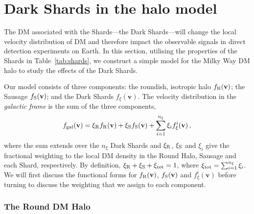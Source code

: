 \documentclass[prd,10pt,twocolumn,showpacs,nofootinbib,aps,superscriptaddress,preprintnumbers]{revtex4-1}
\newcommand{\vbf}{\mathbf{v}}
\newcommand{\fR}{f_{\rm R}}
\newcommand{\fS}{f_{\rm S}}
\newcommand{\Gaia}{\!{\it Gaia}\xspace}
\begin{document}
 \section{Dark Shards in the halo model}\label{sec:darkshards}

The DM associated with the Shards---the Dark Shards---will
change the local velocity distribution of DM and therefore impact
the observable signals in direct detection experiments on Earth.  In
this section, utilising the properties of the Shards in
Table~\ref{tab:shards}, we construct a simple model for the Milky Way DM halo
to study the effects of the Dark Shards.

  Our model consists of three components: the roundish, isotropic halo
  $\fR (\vbf)$; the \Gaia Sausage $\fS(\vbf)$; and the Dark Shards
  $f_\xi(\vbf)$.  The velocity distribution in the {\it galactic frame}
  is the sum of the three components,
  \begin{equation}\label{eq:shmpp}
    f_{\rm{gal}}(\vbf) = \xi_{\rm{R}} \fR (\vbf) + \xi_{\rm{S}}  \fS(\vbf) +\sum_{i=1}^{n_{\xi}} \xi_i f^i_\xi(\vbf)\, ,
  \end{equation}
  where the sum extends over the $n_{\xi}$ Dark Shards and
  $\xi_{\rm{R}}$, $\xi_{\rm{S}}$ and $\xi_i$ give the fractional
  weighting to the local DM density in the Round Halo,
  Sausage and each Shard, respectively. By definition,
  $\xi_{\rm{R}}+\xi_{\rm{S}}+\xi_{\rm tot} =1$, where $\xi_{\rm tot} =
  \sum_{i=1}^{n_{\xi}} \xi_i$.  We will first discuss the functional
  forms for $\fR (\vbf)$, $\fS(\vbf)$ and $f^i_\xi(\vbf)$ before turning
  to discuss the weighting that we assign to each component.

  \subsubsection{The Round DM Halo}
\end{document}
